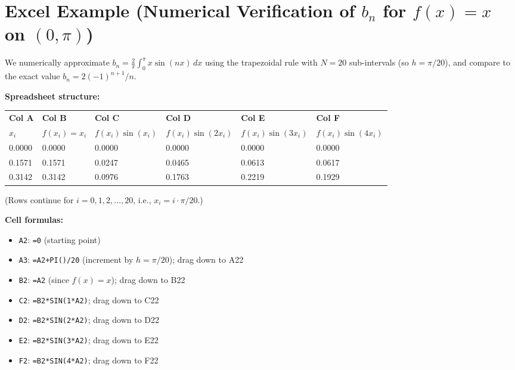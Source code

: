 \documentclass[12pt,a4paper]{article}
\begin{document}
\section{Excel Example (Numerical Verification of $b_n$ for $f(x)=x$ on $(0,\pi)$)}

We numerically approximate $b_n = \frac{2}{\pi}\int_0^{\pi}x\sin(nx)\,dx$ using the trapezoidal rule with $N=20$ sub-intervals (so $h = \pi/20$), and compare to the exact value $b_n = 2(-1)^{n+1}/n$.

\vspace{0.5em}
\textbf{Spreadsheet structure:}

\begin{center}
\begin{tabular}{llllll}
\toprule
\textbf{Col A} & \textbf{Col B} & \textbf{Col C} & \textbf{Col D} & \textbf{Col E} & \textbf{Col F} \\
$x_i$ & $f(x_i)=x_i$ & $f(x_i)\sin(x_i)$ & $f(x_i)\sin(2x_i)$ & $f(x_i)\sin(3x_i)$ & $f(x_i)\sin(4x_i)$ \\
\midrule
0.0000 & 0.0000 & 0.0000 & 0.0000 & 0.0000 & 0.0000 \\
0.1571 & 0.1571 & 0.0247 & 0.0465 & 0.0613 & 0.0617 \\
0.3142 & 0.3142 & 0.0976 & 0.1763 & 0.2219 & 0.1929 \\
\bottomrule
\end{tabular}
\end{center}

(Rows continue for $i=0,1,2,\ldots,20$, i.e., $x_i = i\cdot\pi/20$.)

\vspace{0.5em}
\textbf{Cell formulas:}
\begin{itemize}[noitemsep]
  \item \texttt{A2}: \texttt{=0} \quad (starting point)
  \item \texttt{A3}: \texttt{=A2+PI()/20} \quad (increment by $h=\pi/20$); drag down to A22
  \item \texttt{B2}: \texttt{=A2} \quad (since $f(x)=x$); drag down to B22
  \item \texttt{C2}: \texttt{=B2*SIN(1*A2)}; drag down to C22
  \item \texttt{D2}: \texttt{=B2*SIN(2*A2)}; drag down to D22
  \item \texttt{E2}: \texttt{=B2*SIN(3*A2)}; drag down to E22
  \item \texttt{F2}: \texttt{=B2*SIN(4*A2)}; drag down to F22
\end{itemize}
\end{document}
